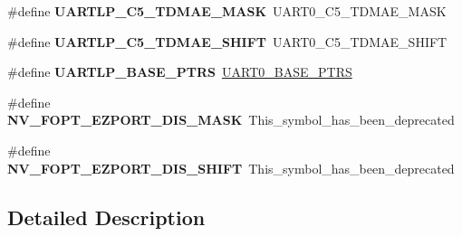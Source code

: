 \begin{DoxyCompactItemize}
\item 
\hypertarget{group___backward___compatibility___symbols_ga7846766b042194a47ed511aa4114210e}{}\#define {\bfseries U\+A\+R\+T\+L\+P\+\_\+\+C5\+\_\+\+T\+D\+M\+A\+E\+\_\+\+M\+A\+S\+K}~U\+A\+R\+T0\+\_\+\+C5\+\_\+\+T\+D\+M\+A\+E\+\_\+\+M\+A\+S\+K\label{group___backward___compatibility___symbols_ga7846766b042194a47ed511aa4114210e}

\item 
\hypertarget{group___backward___compatibility___symbols_gac2909b753be3968e0878180017501e56}{}\#define {\bfseries U\+A\+R\+T\+L\+P\+\_\+\+C5\+\_\+\+T\+D\+M\+A\+E\+\_\+\+S\+H\+I\+F\+T}~U\+A\+R\+T0\+\_\+\+C5\+\_\+\+T\+D\+M\+A\+E\+\_\+\+S\+H\+I\+F\+T\label{group___backward___compatibility___symbols_gac2909b753be3968e0878180017501e56}

\item 
\hypertarget{group___backward___compatibility___symbols_ga1913c55fe9312bdb0414edc7553329f3}{}\#define {\bfseries U\+A\+R\+T\+L\+P\+\_\+\+B\+A\+S\+E\+\_\+\+P\+T\+R\+S}~\hyperlink{group___u_a_r_t0___peripheral_ga9416d89d2bc04eb37311da5910f1c701}{U\+A\+R\+T0\+\_\+\+B\+A\+S\+E\+\_\+\+P\+T\+R\+S}\label{group___backward___compatibility___symbols_ga1913c55fe9312bdb0414edc7553329f3}

\item 
\hypertarget{group___backward___compatibility___symbols_ga5c130a6f11de9f04a77b36fd61843e8f}{}\#define {\bfseries N\+V\+\_\+\+F\+O\+P\+T\+\_\+\+E\+Z\+P\+O\+R\+T\+\_\+\+D\+I\+S\+\_\+\+M\+A\+S\+K}~This\+\_\+symbol\+\_\+has\+\_\+been\+\_\+deprecated\label{group___backward___compatibility___symbols_ga5c130a6f11de9f04a77b36fd61843e8f}

\item 
\hypertarget{group___backward___compatibility___symbols_gabf1111ccacc4104b2855c4f3851cbaa5}{}\#define {\bfseries N\+V\+\_\+\+F\+O\+P\+T\+\_\+\+E\+Z\+P\+O\+R\+T\+\_\+\+D\+I\+S\+\_\+\+S\+H\+I\+F\+T}~This\+\_\+symbol\+\_\+has\+\_\+been\+\_\+deprecated\label{group___backward___compatibility___symbols_gabf1111ccacc4104b2855c4f3851cbaa5}

\end{DoxyCompactItemize}


\subsection{Detailed Description}
